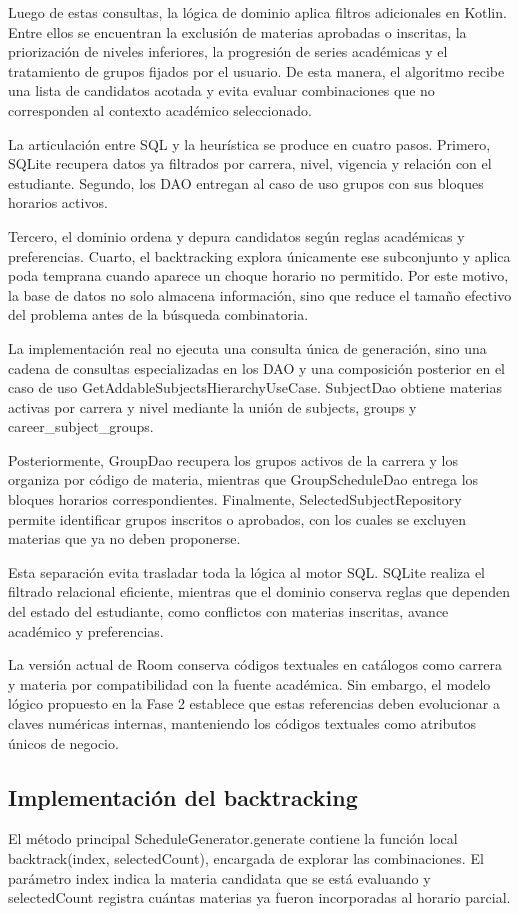 Luego de estas consultas, la lógica de dominio aplica filtros adicionales en Kotlin. Entre ellos se encuentran la exclusión de materias aprobadas o inscritas, la priorización de niveles inferiores, la progresión de series académicas y el tratamiento de grupos fijados por el usuario. De esta manera, el algoritmo recibe una lista de candidatos acotada y evita evaluar combinaciones que no corresponden al contexto académico seleccionado.

La articulación entre SQL y la heurística se produce en cuatro pasos. Primero, SQLite recupera datos ya filtrados por carrera, nivel, vigencia y relación con el estudiante. Segundo, los DAO entregan al caso de uso grupos con sus bloques horarios activos.

Tercero, el dominio ordena y depura candidatos según reglas académicas y preferencias. Cuarto, el backtracking explora únicamente ese subconjunto y aplica poda temprana cuando aparece un choque horario no permitido. Por este motivo, la base de datos no solo almacena información, sino que reduce el tamaño efectivo del problema antes de la búsqueda combinatoria.

La implementación real no ejecuta una consulta única de generación, sino una cadena de consultas especializadas en los DAO y una composición posterior en el caso de uso GetAddableSubjectsHierarchyUseCase. SubjectDao obtiene materias activas por carrera y nivel mediante la unión de subjects, groups y career\_subject\_groups.

Posteriormente, GroupDao recupera los grupos activos de la carrera y los organiza por código de materia, mientras que GroupScheduleDao entrega los bloques horarios correspondientes. Finalmente, SelectedSubjectRepository permite identificar grupos inscritos o aprobados, con los cuales se excluyen materias que ya no deben proponerse.

Esta separación evita trasladar toda la lógica al motor SQL. SQLite realiza el filtrado relacional eficiente, mientras que el dominio conserva reglas que dependen del estado del estudiante, como conflictos con materias inscritas, avance académico y preferencias.

La versión actual de Room conserva códigos textuales en catálogos como carrera y materia por compatibilidad con la fuente académica. Sin embargo, el modelo lógico propuesto en la Fase 2 establece que estas referencias deben evolucionar a claves numéricas internas, manteniendo los códigos textuales como atributos únicos de negocio.

\subsection{Implementación del backtracking}
El método principal ScheduleGenerator.generate contiene la función local backtrack(index, selectedCount), encargada de explorar las combinaciones. El parámetro index indica la materia candidata que se está evaluando y selectedCount registra cuántas materias ya fueron incorporadas al horario parcial.

